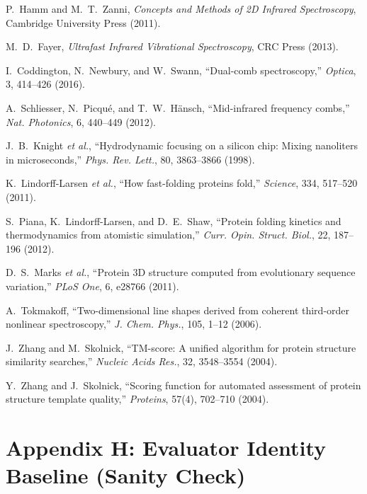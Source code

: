 \documentclass[12pt,a4paper]{article}
\begin{document}
\begin{thebibliography}{99}
P.~Hamm and M.~T.~Zanni, \emph{Concepts and Methods of 2D Infrared Spectroscopy}, Cambridge University Press (2011).

M.~D.~Fayer, \emph{Ultrafast Infrared Vibrational Spectroscopy}, CRC Press (2013).

I.~Coddington, N.~Newbury, and W.~Swann, ``Dual-comb spectroscopy,'' \emph{Optica}, 3, 414–426 (2016).

A.~Schliesser, N.~Picqué, and T.~W.~Hänsch, ``Mid-infrared frequency combs,'' \emph{Nat. Photonics}, 6, 440–449 (2012).

J.~B.~Knight \emph{et al.}, ``Hydrodynamic focusing on a silicon chip: Mixing nanoliters in microseconds,'' \emph{Phys. Rev. Lett.}, 80, 3863–3866 (1998).

K.~Lindorff-Larsen \emph{et al.}, ``How fast-folding proteins fold,'' \emph{Science}, 334, 517–520 (2011).

S.~Piana, K.~Lindorff-Larsen, and D.~E.~Shaw, ``Protein folding kinetics and thermodynamics from atomistic simulation,'' \emph{Curr. Opin. Struct. Biol.}, 22, 187–196 (2012).

D.~S.~Marks \emph{et al.}, ``Protein 3D structure computed from evolutionary sequence variation,'' \emph{PLoS One}, 6, e28766 (2011).

A.~Tokmakoff, ``Two-dimensional line shapes derived from coherent third-order nonlinear spectroscopy,'' \emph{J. Chem. Phys.}, 105, 1–12 (2006).  %

J.~Zhang and M.~Skolnick, ``TM-score: A unified algorithm for protein structure similarity searches,'' \emph{Nucleic Acids Res.}, 32, 3548–3554 (2004).

Y.~Zhang and J.~Skolnick, ``Scoring function for automated assessment of protein structure template quality,'' \emph{Proteins}, 57(4), 702–710 (2004).

\end{thebibliography}

\appendix
\section*{Appendix H: Evaluator Identity Baseline (Sanity Check)}
\end{document}

